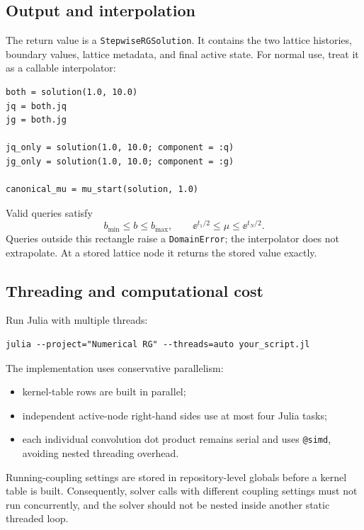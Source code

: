 \subsection{Output and interpolation}

The return value is a \texttt{StepwiseRGSolution}. It contains the two lattice
histories, boundary values, lattice metadata, and final active state. For
normal use, treat it as a callable interpolator:

\begin{lstlisting}
both = solution(1.0, 10.0)
jq = both.jq
jg = both.jg

jq_only = solution(1.0, 10.0; component = :q)
jg_only = solution(1.0, 10.0; component = :g)

canonical_mu = mu_start(solution, 1.0)
\end{lstlisting}

Valid queries satisfy
\begin{equation}
  b_{\min}\le b\le b_{\max},
  \qquad
  \ee^{t_1/2}\le\mu\le\ee^{t_N/2}.
  \label{eq:query-domain}
\end{equation}
Queries outside this rectangle raise a \texttt{DomainError}; the interpolator
does not extrapolate. At a stored lattice node it returns the stored value
exactly.

\subsection{Threading and computational cost}

Run Julia with multiple threads:
\begin{lstlisting}
julia --project="Numerical RG" --threads=auto your_script.jl
\end{lstlisting}
The implementation uses conservative parallelism:
\begin{itemize}[leftmargin=1.5em]
  \item kernel-table rows are built in parallel;
  \item independent active-node right-hand sides use at most four Julia tasks;
  \item each individual convolution dot product remains serial and uses
  \texttt{@simd}, avoiding nested threading overhead.
\end{itemize}

Running-coupling settings are stored in repository-level globals before a
kernel table is built. Consequently, solver calls with different coupling
settings must not run concurrently, and the solver should not be nested
inside another static threaded loop.

